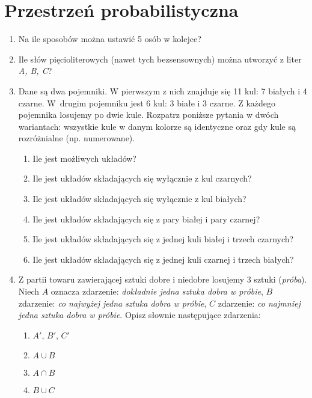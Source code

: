 \documentclass{mwart}
\newcommand{\ans}[1]{}
\newcommand{\ans}[1]{\emph{Odpowiedź:} #1}
\begin{document}
\section{Przestrzeń probabilistyczna}
\begin{enumerate}
\item Na ile sposobów można ustawić 5 osób w kolejce? \ans{$5!$}
\item Ile słów pięcioliterowych (nawet tych bezsensownych) można utworzyć z liter \emph{A, B, C}? \ans{$3^5=243$}
\item Dane są dwa pojemniki. W pierwszym z nich znajduje się 11 kul: 7 białych i 4 czarne. W~drugim pojemniku jest 6 kul: 3 białe i 3 czarne. Z każdego pojemnika losujemy po dwie kule.
Rozpatrz poniższe pytania w dwóch wariantach: wszystkie kule w danym kolorze są identyczne oraz gdy kule są rozróżnialne (np. numerowane).
\begin{enumerate}
\item Ile jest możliwych układów? \ans{${11 \choose 2}{6 \choose 2}=825$}
\item Ile jest układów składających się wyłącznie z kul czarnych? \ans{${4 \choose 2}{3 \choose 2}=18$}
\item Ile jest układów składających się wyłącznie z kul białych? \ans{${7 \choose 2}{3 \choose 2}=63$}
\item Ile jest układów składających się z pary białej i pary czarnej? \ans{${7\choose 2}{3 \choose 2}+{4 \choose 2}{3 \choose 2}+7\cdot4\cdot3\cdot3=333$}
\item Ile jest układów składających się z jednej kuli białej i trzech czarnych? \ans{$7\cdot4\cdot{3\choose 2}+3\cdot3\cdot{4\choose 2}=138$}
\item Ile jest układów składających się z jednej kuli czarnej i trzech białych?  \ans{$4\cdot7\cdot{3\choose 2}+3\cdot3\cdot{7\choose 2}=273$}
\end{enumerate}
\item Z partii towaru zawierającej sztuki dobre i niedobre losujemy 3 sztuki (\emph{próba}). Niech $A$ oznacza zdarzenie: \emph{dokładnie jedna sztuka dobra w próbie}, $B$ zdarzenie: \emph{co najwyżej jedna sztuka dobra w próbie}, $C$ zdarzenie: \emph{co najmniej jedna sztuka dobra w próbie}. Opisz słownie następujące zdarzenia:
\begin{enumerate}
\item $A'$, $B'$, $C'$
\item $A\cup B$
\item $A\cap B$
\item $B\cup C$

\end{enumerate}
\end{enumerate}
\end{document}

